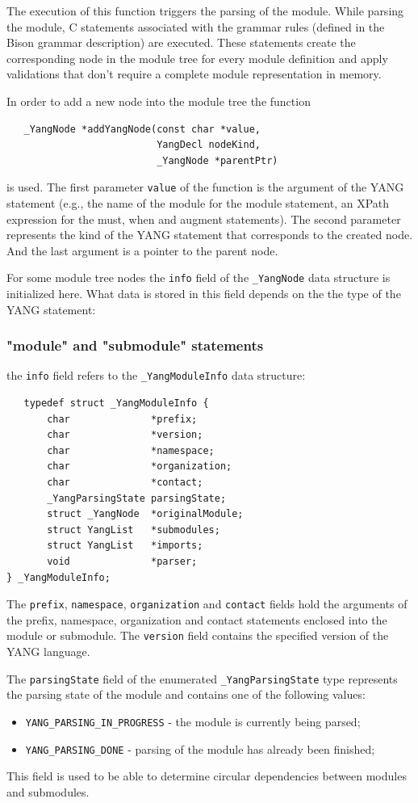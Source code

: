 \documentclass[conference]{IEEEtran}
\begin{document}
The execution of this function triggers the parsing of the module. While parsing the module, C statements associated with the grammar rules (defined in the Bison grammar description) are executed. These statements create the corresponding node in the module tree for every module definition and apply validations that don't require a complete module representation in memory.

In order to add a new node into the module tree the function
\small
\begin{verbatim}
   _YangNode *addYangNode(const char *value, 
                          YangDecl nodeKind, 
                          _YangNode *parentPtr)
\end{verbatim}
\normalsize
is used.
The first parameter \texttt{value} of the function is the argument of the YANG statement (e.g., the name of the module for the module statement, an XPath expression for the must, when and augment statements). The second parameter represents the kind of the YANG statement that corresponds to the created node. And the last argument is a pointer to the parent node.

For some module tree nodes the \texttt{info} field of the \texttt{\_YangNode} data structure is initialized here. What data is stored in this field depends on the the type of the YANG statement:
\subsubsection{"module" and "submodule" statements}
the \texttt{info} field refers to the \texttt{\_YangModuleInfo} data structure:

\small
\begin{verbatim}
   typedef struct _YangModuleInfo {
       char              *prefix;
       char              *version;
       char              *namespace;
       char              *organization;
       char              *contact;
       _YangParsingState parsingState;
       struct _YangNode  *originalModule;
       struct YangList   *submodules;
       struct YangList   *imports;
       void              *parser;
} _YangModuleInfo;
\end{verbatim}
\normalsize
The \texttt{prefix}, \texttt{namespace}, \texttt{organization} and \texttt{contact} fields hold the arguments of the prefix, namespace, organization and contact statements enclosed into the module or submodule. The \texttt{version} field contains the specified version of the YANG language.

The \texttt{parsingState} field of the enumerated \texttt{\_YangParsingState} type represents the parsing state of the module and contains one of the following values:
\begin{itemize}
\item \texttt{YANG\_PARSING\_IN\_PROGRESS} - the module is currently being parsed;
\item \texttt{YANG\_PARSING\_DONE} - parsing of the module has already been finished;
\end{itemize}
This field is used to be able to determine circular dependencies between modules and submodules.
\end{document}

